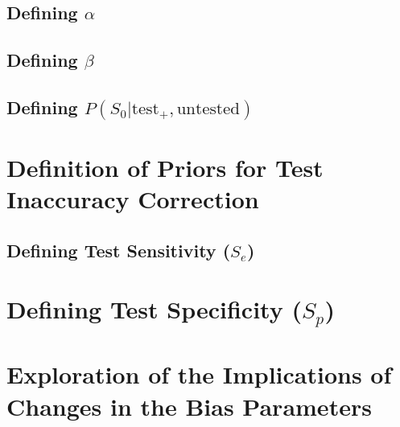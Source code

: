 \documentclass[12pt,twoside]{smiththesis}
\begin{document}
\hypertarget{defining-alpha}{%
\subsection{\texorpdfstring{Defining \(\alpha\)}{Defining \textbackslash alpha}}\label{defining-alpha}}

\hypertarget{defining-beta}{%
\subsection{\texorpdfstring{Defining \(\beta\)}{Defining \textbackslash beta}}\label{defining-beta}}

\hypertarget{defining-ps_0texttest_textuntested}{%
\subsection{\texorpdfstring{Defining \(P(S_0|\text{test}_+,\text{untested})\)}{Defining P(S\_0\textbar\textbackslash text\{test\}\_+,\textbackslash text\{untested\})}}\label{defining-ps_0texttest_textuntested}}

\hypertarget{definition-of-priors-for-test-inaccuracy-correction}{%
\section{Definition of Priors for Test Inaccuracy Correction}\label{definition-of-priors-for-test-inaccuracy-correction}}

\hypertarget{defining-test-sensitivity-s_e}{%
\subsection{\texorpdfstring{Defining Test Sensitivity (\(S_e\))}{Defining Test Sensitivity (S\_e)}}\label{defining-test-sensitivity-s_e}}

\hypertarget{defining-test-specificity-s_p}{%
\section{\texorpdfstring{Defining Test Specificity (\(S_p\))}{Defining Test Specificity (S\_p)}}\label{defining-test-specificity-s_p}}

\hypertarget{exploration-of-the-implications-of-changes-in-the-bias-parameters}{%
\section{Exploration of the Implications of Changes in the Bias Parameters}\label{exploration-of-the-implications-of-changes-in-the-bias-parameters}}
\end{document}
